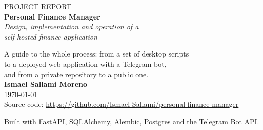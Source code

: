 \documentclass[11pt,a4paper,oneside]{report}
\begin{document}
\begin{titlepage}
\centering
\vspace*{2.2cm}

{\color{dim}\large PROJECT REPORT}\\[0.9cm]

{\color{accent}\Huge\bfseries Personal Finance Manager}\\[0.5cm]
{\Large\itshape Design, implementation and operation of a\\ self-hosted finance application}\\[1.4cm]


\vspace{1.4cm}

{\large A guide to the whole process: from a set of desktop scripts\\
to a deployed web application with a Telegram bot,\\
and from a private repository to a public one.}\\[2.2cm]

{\large\bfseries Ismael Sallami Moreno}\\[0.4cm]
{\color{dim}\today}\\[1.6cm]

{\small\color{dim}
Source code: \url{https://github.com/Ismael-Sallami/personal-finance-manager}}

\vfill
{\small\color{dim} Built with FastAPI, SQLAlchemy, Alembic, Postgres and the Telegram Bot API.}
\end{titlepage}

\tableofcontents
\thispagestyle{empty}
\clearpage















\end{document}
